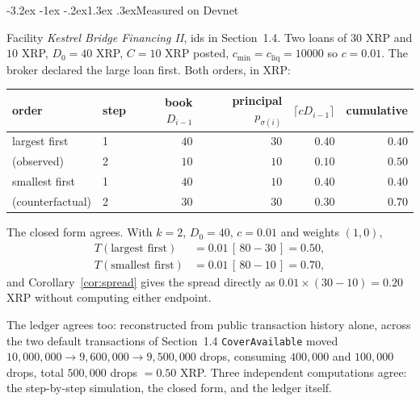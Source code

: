\documentclass[11pt]{article}
\makeatletter
\renewcommand\subsection{\@startsection{subsection}{2}{\z@}%
  {-3.2ex \@plus -1ex \@minus -.2ex}{1.3ex \@plus .3ex}{\normalfont\large\bfseries}}
\theoremstyle{orma}
\theoremstyle{ormaupright}
\makeatother
\begin{document}
\subsection{Measured on Devnet}

Facility \emph{Kestrel Bridge Financing II}, ids in Section~1.4. Two loans of $30$ XRP and
$10$ XRP, $D_0 = 40$ XRP, $C = 10$ XRP posted, $c_{\min} = c_{\mathrm{liq}} = 10000$ so
$c = 0.01$. The broker declared the large loan first. Both orders, in XRP:

\begin{center}
\small
\setlength{\tabcolsep}{7pt}
\begin{tabular}{llrrrr}
\toprule
order & step & book $D_{i-1}$ & principal $p_{\sigma(i)}$ & $\lceil c D_{i-1} \rceil$ & cumulative \\
\midrule
largest first    & 1 & $40$ & $30$ & $0.40$ & $0.40$ \\
(observed)       & 2 & $10$ & $10$ & $0.10$ & $\mathbf{0.50}$ \\
\addlinespace
smallest first   & 1 & $40$ & $10$ & $0.40$ & $0.40$ \\
(counterfactual) & 2 & $30$ & $30$ & $0.30$ & $\mathbf{0.70}$ \\
\bottomrule
\end{tabular}
\end{center}

\pagebreak

The closed form agrees. With $k = 2$, $D_0 = 40$, $c = 0.01$ and weights $(1,0)$,
\begin{align}
  T(\text{largest first}) &= 0.01\,[\,80 - 30\,] = 0.50,
  \\[4pt]
  T(\text{smallest first}) &= 0.01\,[\,80 - 10\,] = 0.70,
\end{align}
and Corollary~\ref{cor:spread} gives the spread directly as $0.01 \times (30 - 10) = 0.20$
XRP without computing either endpoint.

The ledger agrees too: reconstructed from public
transaction history alone, across the two default transactions of Section~1.4
\texttt{CoverAvailable} moved
$10{,}000{,}000 \rightarrow 9{,}600{,}000 \rightarrow 9{,}500{,}000$ drops, consuming
$400{,}000$ and $100{,}000$ drops, total $500{,}000$ drops $= 0.50$ XRP. Three independent
computations agree: the step-by-step simulation, the closed form, and the ledger itself.
\end{document}
